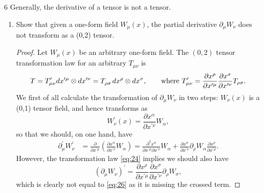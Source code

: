 \documentclass[11pt]{article}
\begin{document}
\begin{problem}{6}
	Generally, the derivative of a tensor is not a tensor.
	\begin{enumerate}[label=(\alph*)]
		\item Show that given a one-form field \( W_{\mu}(x) \), the partial derivative \(\partial_{\mu}W_{\nu}\) does not transform as a (0,2) tensor.
		      \begin{proof}
			      Let \( W_{\mu}(x) \) be an arbitrary one-form field.
			      The \( (0,2) \) tensor transformation law for an arbitrary \( T_{\mu\nu} \) is
			      \begin{equation}
				      \label{eq:24}
				      T = T^{\prime}_{\mu\nu}dx^{\prime\mu}\otimes dx^{\prime\nu} = \tensor{T}{ _{\rho\sigma} }dx^{\rho}\otimes dx^{\sigma}, \qquad \text{where }T^{\prime}_{\mu\nu} = \frac{\partial x^{\rho}}{\partial x^{\prime\mu}} \frac{\partial x^{\sigma}}{\partial x^{\prime \nu}} T_{\rho\sigma}.
			      \end{equation}
			      We first of all calculate the transformation of \(\partial_{\mu}W_{\nu}\) in two steps: \( W_{\nu}(x) \) is a (0,1) tensor field, and hence transforms as
			      \begin{equation}
				      \label{eq:25}
				      W_{\nu}^{\prime}(x) = \frac{\partial x^{\alpha}}{\partial x^{\prime\nu}} W_{\alpha},
			      \end{equation}
			      so that we should, on one hand, have
			      \begin{equation}
				      \label{eq:26}
				      \begin{aligned}
					      \partial_{\mu}^{\prime}W_{\nu}^{\prime} & = \frac{\partial }{\partial x^{\prime\mu}} \left( \frac{\partial x^{\alpha}}{\partial x^{\prime\nu}} W_{\alpha} \right) = \frac{\partial^2 x^{\alpha}}{\partial x^{\prime\mu} \partial x^{\prime\nu}} W_{\alpha} + \frac{\partial x^{\alpha}}{\partial x^{\prime\nu}} \partial_{\rho}W_{\alpha} \frac{\partial x^{\rho}}{\partial x^{\prime\mu}}.
				      \end{aligned}
			      \end{equation}
			      However, the transformation law \cref{eq:24} implies we should also have
			      \begin{equation}
				      \label{eq:27}
				      (\partial_{\mu}W_{\nu})^{\prime} = \frac{\partial x^{\rho}}{\partial x^{\prime\mu}} \frac{\partial x^{\sigma}}{\partial x^{\prime\nu}} \partial_{\rho}W_{\sigma},
			      \end{equation}
			      which is clearly not equal to \cref{eq:26} as it is missing the crossed term.

\end{proof}
\end{enumerate}
\end{problem}
\end{document}
